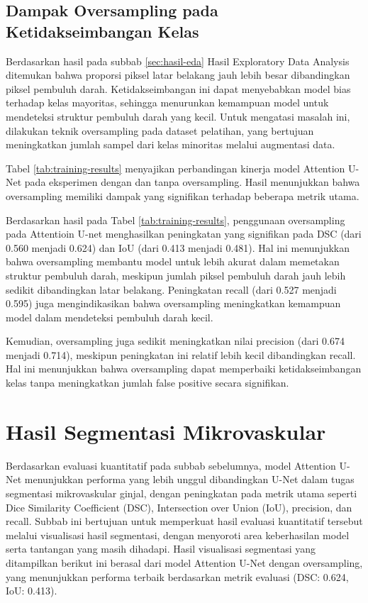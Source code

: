 \subsection{Dampak Oversampling pada Ketidakseimbangan Kelas}

\noindent Berdasarkan hasil pada subbab \ref{sec:hasil-eda} Hasil Exploratory Data Analysis ditemukan bahwa proporsi piksel latar belakang jauh lebih besar dibandingkan piksel pembuluh darah. Ketidakseimbangan ini dapat menyebabkan model bias terhadap kelas mayoritas, sehingga menurunkan kemampuan model untuk mendeteksi struktur pembuluh darah yang kecil. Untuk mengatasi masalah ini, dilakukan teknik oversampling pada dataset pelatihan, yang bertujuan meningkatkan jumlah sampel dari kelas minoritas melalui augmentasi data.


\noindent Tabel \ref{tab:training-results} menyajikan perbandingan kinerja model Attention U-Net pada eksperimen dengan dan tanpa oversampling. Hasil menunjukkan bahwa oversampling memiliki dampak yang signifikan terhadap beberapa metrik utama.

\noindent Berdasarkan hasil pada Tabel \ref{tab:training-results}, penggunaan oversampling pada Attentioin U-net menghasilkan peningkatan yang signifikan pada DSC (dari 0.560 menjadi 0.624) dan IoU (dari 0.413 menjadi 0.481). Hal ini menunjukkan bahwa oversampling membantu model untuk lebih akurat dalam memetakan struktur pembuluh darah, meskipun jumlah piksel pembuluh darah jauh lebih sedikit dibandingkan latar belakang. Peningkatan recall (dari 0.527 menjadi 0.595) juga mengindikasikan bahwa oversampling meningkatkan kemampuan model dalam mendeteksi pembuluh darah kecil.

\noindent Kemudian, oversampling juga sedikit meningkatkan nilai precision (dari 0.674 menjadi 0.714), meskipun peningkatan ini relatif lebih kecil dibandingkan recall. Hal ini menunjukkan bahwa oversampling dapat memperbaiki ketidakseimbangan kelas tanpa meningkatkan jumlah false positive secara signifikan.


\section{Hasil Segmentasi Mikrovaskular}

\noindent Berdasarkan evaluasi kuantitatif pada subbab sebelumnya, model Attention U-Net menunjukkan performa yang lebih unggul dibandingkan U-Net dalam tugas segmentasi mikrovaskular ginjal, dengan peningkatan pada metrik utama seperti Dice Similarity Coefficient (DSC), Intersection over Union (IoU), precision, dan recall. Subbab ini bertujuan untuk memperkuat hasil evaluasi kuantitatif tersebut melalui visualisasi hasil segmentasi, dengan menyoroti area keberhasilan model serta tantangan yang masih dihadapi. Hasil visualisasi segmentasi yang ditampilkan berikut ini berasal dari model Attention U-Net dengan oversampling, yang menunjukkan performa terbaik berdasarkan metrik evaluasi (DSC: 0.624, IoU: 0.413).



